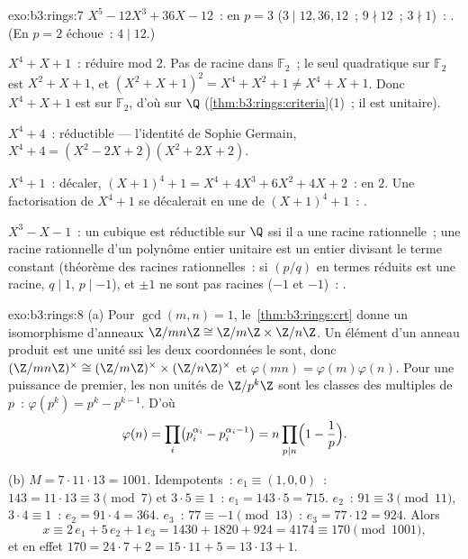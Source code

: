 \begin{solution}{exo:b3:rings:7}
\emph{$X^5 - 12X^3 + 36X - 12$}~:  en $p = 3$ ($3 \mid
12, 36, 12$~; $9 \nmid 12$~; $3 \nmid 1$)~: . (En $p
= 2$  échoue~: $4 \mid 12$.)

\emph{$X^4 + X + 1$}~: réduire mod $2$. Pas de racine dans
$\mathbb F_2$~; le seul quadratique  sur $\mathbb
F_2$ est $X^2 + X + 1$, et $(X^2+X+1)^2 = X^4 + X^2 + 1 \neq X^4
+ X + 1$. Donc $X^4 + X + 1$ est  sur $\mathbb F_2$,
d'où sur $\Q$ (\cref{thm:b3:rings:criteria}(1)~; il est
unitaire).

\emph{$X^4 + 4$}~: réductible --- l'identité de Sophie Germain,
$X^4 + 4 = (X^2 - 2X + 2)(X^2 + 2X + 2)$.

\emph{$X^4 + 1$}~: décaler, $(X+1)^4 + 1 = X^4 + 4X^3 + 6X^2 +
4X + 2$~:  en $2$. Une factorisation de $X^4+1$ se
décalerait en une de $(X+1)^4 + 1$~: .

\emph{$X^3 - X - 1$}~: un cubique est réductible sur $\Q$ ssi il
a une racine rationnelle~; une racine rationnelle d'un polynôme
entier unitaire est un entier divisant le terme constant
(théorème des racines rationnelles~: si $(p/q)$ en termes
réduits est une racine, $q \mid 1$, $p \mid -1$), et $\pm 1$ ne
sont pas racines ($-1$ et $-1$)~: .
\end{solution}

\begin{solution}{exo:b3:rings:8}
(a) Pour $\gcd(m, n) = 1$, le~\cref{thm:b3:rings:crt} donne un
isomorphisme d'anneaux $\Z/mn\Z \cong \Z/m\Z \times \Z/n\Z$. Un
élément d'un anneau produit est une unité ssi les deux
coordonnées le sont, donc $(\Z/mn\Z)^\times \cong
(\Z/m\Z)^\times \times (\Z/n\Z)^\times$ et $\varphi(mn) =
\varphi(m)\varphi(n)$. Pour une puissance de premier, les non
unités de $\Z/p^k\Z$ sont les classes des multiples de $p$~:
$\varphi(p^k) = p^k - p^{k-1}$. D'où
\[
\varphi(n) = \prod_i \bigl(p_i^{\alpha_i} -
p_i^{\alpha_i-1}\bigr) = n \prod_{p \mid n}\Bigl(1 -
\frac1p\Bigr).
\]

(b) $M = 7 \cdot 11 \cdot 13 = 1001$. Idempotents~: $e_1 \equiv
(1, 0, 0)$~: $143 = 11\cdot13 \equiv 3 \pmod 7$ et $3 \cdot 5
\equiv 1$~: $e_1 = 143 \cdot 5 = 715$. $e_2$~: $91 \equiv 3
\pmod{11}$, $3 \cdot 4 \equiv 1$~: $e_2 = 91\cdot4 = 364$.
$e_3$~: $77 \equiv -1 \pmod{13}$~: $e_3 = 77 \cdot 12 = 924$.
Alors
\[
x \equiv 2\,e_1 + 5\,e_2 + 1\,e_3 = 1430 + 1820 + 924 = 4174
\equiv 170 \pmod{1001},
\]
et en effet $170 = 24\cdot7 + 2 = 15\cdot11 + 5 = 13\cdot13 +
1$.
\end{solution}

